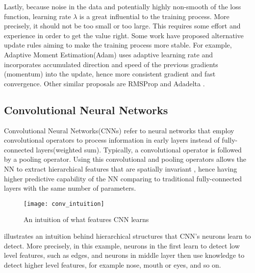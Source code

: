 Lastly, because noise in the data and potentially highly non-smooth of the loss function, learning rate $\lambda$ is a great influential to the training process. More precisely, it should not be too small or too large. This requires some effort and experience in order to get the value right. Some work have proposed alternative update rules aiming to make the training process more stable. For example,  Adaptive Moment Estimation(Adam)\cite{KingmaAdamMethodStochastic2014}  uses adaptive learning rate  and incorporates accumulated direction and speed of the previous gradients (momentum) into the update, hence more consistent gradient and fast convergence. Other similar proposals are RMSProp \cite{TielemanLectureRmsPropDivide2012} and Adadelta \cite{ZeilerADADELTAAdaptiveLearning2012}.


\subsection{Convolutional Neural Networks}
Convolutional Neural Networks(CNNs) refer to neural networks that employ convolutional operators to process information in early layers instead of fully-connected layers(weighted sum). Typically, a convolutional operator is followed by a pooling operator. Using this convolutional and pooling operators allows the NN to extract hierarchical features that are spatially invariant \cite{ZeilerVisualizingUnderstandingConvolutional2013}, hence having higher predictive capability of the NN comparing to traditional fully-connected layers with the same number of parameters.


\begin{figure}[ht!]
    \begin{center}
		\texttt{[image: conv\_intuition]}
		\caption[]{An intuition of what features CNN learns}
		\label{fig:conv_intuition}
	\end{center}

\end{figure}

\addfigure{\ref{fig:conv_intuition}} illustrates an intuition  behind hierarchical structures that CNN's neurons learn to detect. More precisely, in this example, neurons in the first learn to detect low level features, such as edges, and neurons in middle layer then use knowledge to detect higher level features, for example nose, mouth or eyes, and so on.

